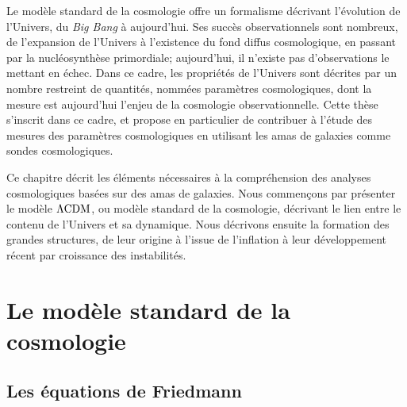 
Le modèle standard de la cosmologie offre un formalisme décrivant l'évolution de l'Univers, du \textit{Big Bang} à aujourd'hui.
Ses succès observationnels sont nombreux, de l'expansion de l'Univers à l'existence du fond diffus cosmologique, en passant par la nucléosynthèse primordiale; aujourd'hui, il n'existe pas d'observations le mettant en échec.
Dans ce cadre, les propriétés de l'Univers sont décrites par un nombre restreint de quantités, nommées paramètres cosmologiques, dont la mesure est aujourd'hui l'enjeu de la cosmologie observationnelle.
Cette thèse s'inscrit dans ce cadre, et propose en particulier de contribuer à l'étude des mesures des paramètres cosmologiques en utilisant les amas de galaxies comme sondes cosmologiques.

Ce chapitre décrit les éléments nécessaires à la compréhension des analyses cosmologiques basées sur des amas de galaxies.
Nous commençons par présenter le modèle $\Lambda {\rm CDM}$, ou modèle standard de la cosmologie, décrivant le lien entre le contenu de l'Univers et sa dynamique.
Nous décrivons ensuite la formation des grandes structures, de leur origine à l'issue de l'inflation à leur développement récent par croissance des instabilités.

\section{Le modèle standard de la cosmologie}

\subsection{Les équations de Friedmann}\label{sec:friedmann}

